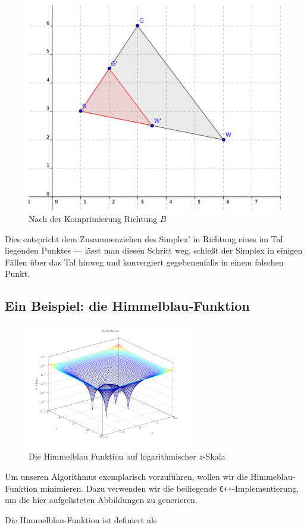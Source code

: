 \documentclass[naustrian]{article}
\begin{document}
{\begin{figure}[h]
    \centering
    \includegraphics[width=.5\textwidth]{nelder_mead/triangle_compress}
    \caption{Nach der Komprimierung Richtung $B$}
\end{figure}

Dies entspricht dem Zusammenziehen des Simplex' in Richtung eines im Tal
liegenden Punktes --- lässt man diesen Schritt weg, schießt der Simplex
in einigen Fällen über das Tal hinweg und konvergiert gegebenenfalls
in einem falschen Punkt.

\subsection{Ein Beispiel: die Himmelblau-Funktion}

\begin{figure}[h]
    \centering
    \includegraphics[width=0.65\textwidth]{nelder_mead/himmelblau}
    \caption{Die Himmelblau Funktion auf logarithmischer $z$-Skala}
\end{figure}

Um unseren Algorithmus exemplarisch vorzuführen, wollen wir die Himmeblau-
Funktion minimieren. Dazu verwenden wir die beiliegende {\tt C++}-Implementierung, um
die hier aufgelisteten Abbildungen zu generieren.

Die Himmelblau-Funktion ist definiert als

}
\end{document}

